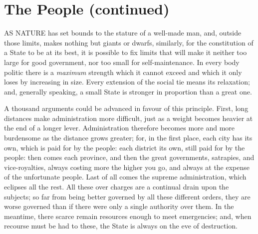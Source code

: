 \documentclass[12pt]{book}
\begin{document}
\section{The People (continued)}

AS NATURE has set bounds to the stature of a well-made man, and, outside those limits, makes nothing but giants or dwarfs, similarly, for the constitution of a State to be at its best, it is possible to fix limits that will make it neither too large for good government, nor too small for self-maintenance. In every body politic there is a \textit{maximum} strength which it cannot exceed and which it only loses by increasing in size. Every extension of the social tie means its relaxation; and, generally speaking, a small State is stronger in proportion than a great one.

A thousand arguments could be advanced in favour of this principle. First, long distances make administration more difficult, just as a weight becomes heavier at the end of a longer lever. Administration therefore becomes more and more burdensome as the distance grows greater; for, in the first place, each city has its own, which is paid for by the people: each district its own, still paid for by the people: then comes each province, and then the great governments, satrapies, and vice-royalties, always costing more the higher you go, and always at the expense of the unfortunate people. Last of all comes the supreme administration, which eclipses all the rest. All these over charges are a continual drain upon the subjects; so far from being better governed by all these different orders, they are worse governed than if there were only a single authority over them. In the meantime, there scarce remain resources enough to meet emergencies; and, when recourse must be had to these, the State is always on the eve of destruction.
\end{document}
